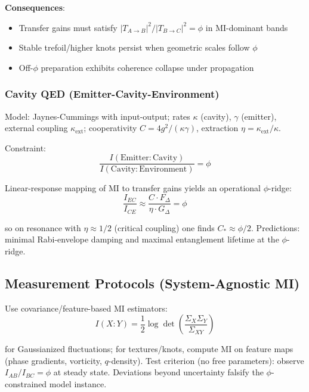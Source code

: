 \documentclass[11pt]{article}
\theoremstyle{definition}
\newcommand{\goldenratio}{\phi}
\begin{document}
\textbf{Consequences}:
\begin{itemize}
\item Transfer gains must satisfy $|T_{A \to B}|^2 / |T_{B \to C}|^2 = \goldenratio$ in MI-dominant bands
\item Stable trefoil/higher knots persist when geometric scales follow $\goldenratio$
\item Off-$\goldenratio$ preparation exhibits coherence collapse under propagation
\end{itemize}

\subsubsection{Cavity QED (Emitter-Cavity-Environment)}

Model: Jaynes-Cummings with input-output; rates $\kappa$ (cavity), $\gamma$ (emitter), external coupling $\kappa_{\text{ext}}$; cooperativity $C = 4g^2/(\kappa\gamma)$, extraction $\eta = \kappa_{\text{ext}}/\kappa$.

Constraint:
\begin{equation}
\frac{I(\text{Emitter}:\text{Cavity})}{I(\text{Cavity}:\text{Environment})} = \goldenratio
\end{equation}

Linear-response mapping of MI to transfer gains yields an operational $\goldenratio$-ridge:
\begin{equation}
\frac{I_{EC}}{I_{CE}} \approx \frac{C \cdot F_\Delta}{\eta \cdot G_\Delta} = \goldenratio
\end{equation}

so on resonance with $\eta \approx 1/2$ (critical coupling) one finds $C_* \approx \goldenratio/2$. Predictions: minimal Rabi-envelope damping and maximal entanglement lifetime at the $\goldenratio$-ridge.

\subsection{Measurement Protocols (System-Agnostic MI)}

Use covariance/feature-based MI estimators:
\begin{equation}
I(X:Y) = \frac{1}{2} \log \det\left(\frac{\Sigma_X \Sigma_Y}{\Sigma_{XY}}\right)
\end{equation}

for Gaussianized fluctuations; for textures/knots, compute MI on feature maps (phase gradients, vorticity, $q$-density). Test criterion (no free parameters): observe $I_{AB}/I_{BC} = \goldenratio$ at steady state. Deviations beyond uncertainty falsify the $\goldenratio$-constrained model instance.
\end{document}
